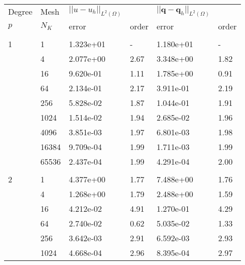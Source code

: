 \begin{table}[H]
\scriptsize
\begin{center}
\begingroup\setlength{\fboxsep}{0pt}
\colorbox{llg}{%
\begin{tabular}{llllll}
\toprule
  Degree       & Mesh &$||u - u_h||_{L^2(\Omega)}$ &        & $||\bm{q} - \bm{q}_h ||_{L^2(\Omega)} $&           \\
  $p$          &     $N_K$      & error                    &  order & error              &  order    \\
\toprule
\hspace{1cm} & \hspace{2cm} &    \hspace{2cm}      & \hspace{1.5cm} &     \hspace{2cm}    &  \hspace{1.5cm}     \\
1 & 1 &  1.323e+01 & - & 1.180e+01 & -\\ 
  & 4 & 2.077e+00 & 2.67 & 3.348e+00 & 1.82\\
  & 16 &  9.620e-01 & 1.11 & 1.785e+00 & 0.91\\
  & 64 &  2.134e-01 & 2.17 & 3.911e-01 & 2.19\\
  & 256 & 5.828e-02 & 1.87 & 1.044e-01 & 1.91\\
  & 1024 & 1.514e-02 & 1.94 & 2.685e-02 & 1.96\\
  & 4096 &  3.851e-03 & 1.97 & 6.801e-03 & 1.98\\
  & 16384 & 9.709e-04 & 1.99 & 1.711e-03 & 1.99\\
  & 65536 & 2.437e-04 & 1.99 & 4.291e-04 & 2.00\\
&&&&& \\
2 & 1 & 4.377e+00 & 1.77 & 7.488e+00 & 1.76\\
  & 4 & 1.268e+00 & 1.79 & 2.488e+00 & 1.59\\
  & 16 & 4.212e-02 & 4.91 & 1.270e-01 & 4.29\\
  & 64 & 2.740e-02 & 0.62 & 5.035e-02 & 1.33\\
  & 256 & 3.642e-03 & 2.91 & 6.592e-03 & 2.93\\
  & 1024 & 4.668e-04 & 2.96 & 8.395e-04 & 2.97\\

\end{tabular}}
\end{center}
\end{table}
